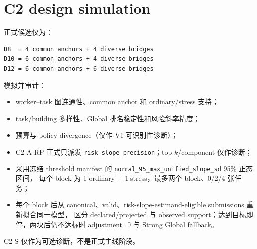 \section{C2 design simulation}

正式候选仅为：
\begin{verbatim}
D8  = 4 common anchors + 4 diverse bridges
D10 = 6 common anchors + 4 diverse bridges
D12 = 6 common anchors + 6 diverse bridges
\end{verbatim}

模拟并审计：
\begin{itemize}
  \item worker--task 图连通性、common anchor 和 ordinary/stress 支持；
  \item task/building 多样性、Global 排名稳定性和风险斜率精度；
  \item 预算与 policy divergence（仅作 V1 可识别性诊断）；
  \item C2-A-RP 正式只派发 \texttt{risk\_slope\_precision}；top-$k$/component 仅作诊断；
  \item 采用冻结 threshold manifest 的 \texttt{normal\_95\_max\_unified\_slope\_sd} 95\% 正态区间，
  每个 block 为 1 ordinary + 1 stress，最多两个 block、0/2/4 张任务；
  \item 每个 block 后从 canonical、valid、risk-slope-estimand-eligible submissions 重新拟合同一模型，
  区分 declared/projected 与 observed support；达到目标即停，两块后仍不达标时 adjustment=0 与
  Strong Global fallback。
\end{itemize}

C2-S 仅作为可选诊断，不是正式主线阶段。
